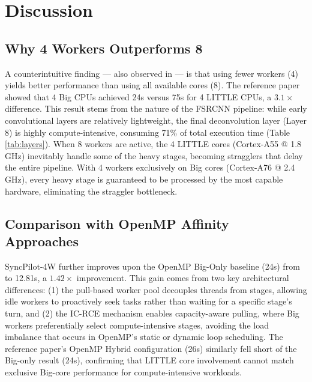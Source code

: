 \documentclass[conference]{IEEEtran}
\begin{document}
\section{Discussion}

\subsection{Why 4 Workers Outperforms 8}
A counterintuitive finding --- also observed in \cite{annisa2025fsrcnn} --- is that using fewer workers (4) yields better performance than using all available cores (8). The reference paper showed that 4 Big CPUs achieved 24s versus 75s for 4 LITTLE CPUs, a $3.1\times$ difference. This result stems from the nature of the FSRCNN pipeline: while early convolutional layers are relatively lightweight, the final deconvolution layer (Layer 8) is highly compute-intensive, consuming 71\% of total execution time (Table \ref{tab:layers}). When 8 workers are active, the 4 LITTLE cores (Cortex-A55 @ 1.8 GHz) inevitably handle some of the heavy stages, becoming stragglers that delay the entire pipeline. With 4 workers exclusively on Big cores (Cortex-A76 @ 2.4 GHz), every heavy stage is guaranteed to be processed by the most capable hardware, eliminating the straggler bottleneck.

\subsection{Comparison with OpenMP Affinity Approaches}
SyncPilot-4W further improves upon the OpenMP Big-Only baseline (24s) from \cite{annisa2025fsrcnn} to 12.81s, a $1.42\times$ improvement. This gain comes from two key architectural differences: (1) the pull-based worker pool decouples threads from stages, allowing idle workers to proactively seek tasks rather than waiting for a specific stage's turn, and (2) the IC-RCE mechanism enables capacity-aware pulling, where Big workers preferentially select compute-intensive stages, avoiding the load imbalance that occurs in OpenMP's static or dynamic loop scheduling. The reference paper's OpenMP Hybrid configuration (26s) similarly fell short of the Big-only result (24s), confirming that LITTLE core involvement cannot match exclusive Big-core performance for compute-intensive workloads.
\end{document}
